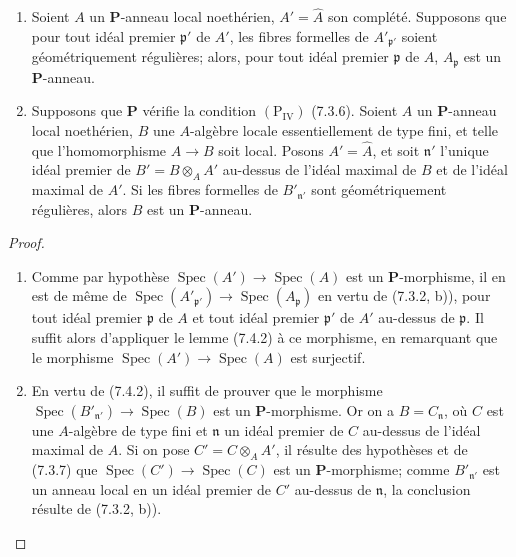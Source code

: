 \begin{corollary}[7.4.3]
\label{IV.2.s7.4.3-fr}
\begin{enumerate}
\item[\emph{(i)}] Soient $A$ un $\boldsymbol P$-anneau local noethérien,
$A'=\widehat A$ son complété. Supposons que pour tout idéal premier
$\mathfrak p'$ de $A'$, les fibres formelles de $A'_{\mathfrak p'}$ soient
géométriquement régulières; alors, pour tout idéal premier $\mathfrak p$ de
$A$, $A_{\mathfrak p}$ est un $\boldsymbol P$-anneau.
\item[\emph{(ii)}] Supposons que $\boldsymbol P$ vérifie la condition
$(\mathrm P_{\mathrm{IV}})$ (7.3.6). Soient $A$ un $\boldsymbol P$-anneau
local noethérien, $B$ une $A$-algèbre locale essentiellement de type fini,
et telle que l'homomorphisme $A\to B$ soit local. Posons $A'=\widehat A$,
et soit $\mathfrak n'$ l'unique idéal premier de
$B'=B\otimes_A A'$ au-dessus de l'idéal maximal de $B$ et de l'idéal
maximal de $A'$. Si les fibres formelles de $B'_{\mathfrak n'}$ sont
géométriquement régulières, alors $B$ est un $\boldsymbol P$-anneau.
\end{enumerate}
\end{corollary}

\begin{proof}
\begin{enumerate}
\item[\emph{(i)}] Comme par hypothèse
$\operatorname{Spec}(A')\to\operatorname{Spec}(A)$ est un
$\boldsymbol P$-morphisme, il en est de même de
$\operatorname{Spec}(A'_{\mathfrak p'})\to
\operatorname{Spec}(A_{\mathfrak p})$ en vertu de (7.3.2, b)), pour tout
idéal premier $\mathfrak p$ de $A$ et tout idéal premier $\mathfrak p'$ de
$A'$ au-dessus de $\mathfrak p$. Il suffit alors d'appliquer le lemme
(7.4.2) à ce morphisme, en remarquant que le morphisme
$\operatorname{Spec}(A')\to\operatorname{Spec}(A)$ est surjectif.
\item[\emph{(ii)}] En vertu de (7.4.2), il suffit de prouver que le morphisme
$\operatorname{Spec}(B'_{\mathfrak n'})\to\operatorname{Spec}(B)$ est un
$\boldsymbol P$-morphisme. Or on a $B=C_{\mathfrak n}$, où $C$ est une
$A$-algèbre de type fini et $\mathfrak n$ un idéal premier de $C$ au-dessus
de l'idéal maximal de $A$. Si on pose $C'=C\otimes_A A'$, il résulte des
hypothèses et de (7.3.7) que
$\operatorname{Spec}(C')\to\operatorname{Spec}(C)$ est un
$\boldsymbol P$-morphisme; comme $B'_{\mathfrak n'}$ est un anneau local en
un idéal premier de $C'$ au-dessus de $\mathfrak n$, la conclusion résulte
de (7.3.2, b)).
\end{enumerate}
\end{proof}

